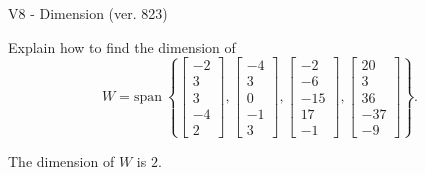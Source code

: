 \begin{exercise}
  \begin{exerciseTitle}V8 - Dimension (ver. 823)\end{exerciseTitle}
  \begin{exerciseStatement}
    Explain how to find the dimension of 
\[W=\mathrm{span}\ \left\{\left[\begin{array}{r}
-2 \\
3 \\
3 \\
-4 \\
2
\end{array}\right] , \left[\begin{array}{r}
-4 \\
3 \\
0 \\
-1 \\
3
\end{array}\right] , \left[\begin{array}{r}
-2 \\
-6 \\
-15 \\
17 \\
-1
\end{array}\right] , \left[\begin{array}{r}
20 \\
3 \\
36 \\
-37 \\
-9
\end{array}\right]\right\}.\]



  \end{exerciseStatement}
  \begin{exerciseAnswer}
   The dimension of \(W\) is  \(2\).
  


  \end{exerciseAnswer}
\end{exercise}